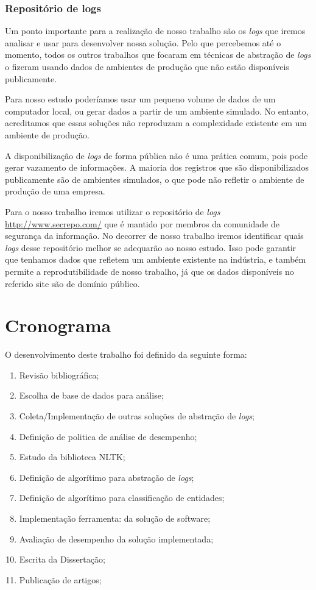 \documentclass[
	12pt,				%
	openright,			%
	twoside,			%
	a4paper,			%
	english,			%
	spanish,			%
	brazil,				%
	]{abntex2}
\begin{document}
\subsection{Repositório de logs}

Um ponto importante para a realização de nosso trabalho são os \emph{logs} que iremos analisar e usar para desenvolver nossa solução. Pelo que percebemos até o momento, todos os outros trabalhos que focaram em técnicas de abstração de \emph{logs} o fizeram usando dados de ambientes de produção que não estão disponíveis publicamente.

Para nosso estudo poderíamos usar um pequeno volume de dados de um computador local, ou gerar dados a partir de um ambiente simulado. No entanto, acreditamos que essas soluções não reproduzam a complexidade existente em um ambiente de produção.

A disponibilização de \emph{logs} de forma pública não é uma prática comum, pois pode gerar vazamento de informações. A maioria dos registros que são disponibilizados publicamente são de ambientes simulados, o que pode não refletir o ambiente de produção de uma empresa.

Para o nosso trabalho iremos utilizar o repositório de \emph{logs} \url{http://www.secrepo.com/} que é mantido por membros da comunidade de segurança da informação. No decorrer de nosso trabalho iremos identificar quais \emph{logs} desse repositório melhor se adequarão ao nosso estudo. Isso pode garantir que tenhamos dados que refletem um ambiente existente na indústria, e também permite a reprodutibilidade de nosso trabalho, já que os dados disponíveis no referido site são de domínio público.

\chapter{Cronograma}\label{chap:cronograma}
O desenvolvimento deste trabalho foi definido da seguinte forma:

\begin{enumerate}
	\item \label{rev-bibli} Revisão bibliográfica;
	\item \label{esc-base} Escolha de base de dados para análise;
	\item \label{imp-outras} Coleta/Implementação de outras soluções de abstração de \emph{logs};
	\item \label{def-pol} Definição de politica de análise de desempenho;
	\item \label{est-nltk} Estudo da biblioteca NLTK;
	\item \label{algo-abs} Definição de algorítimo para abstração de \emph{logs};
	\item \label{algo-clas} Definição de algorítimo para classificação de entidades;
	\item \label{imp-sol} Implementação ferramenta: da solução de software;
	\item \label{ava-des} Avaliação de desempenho da solução implementada;
	\item \label{esc-dis} Escrita da Dissertação;
	\item \label{pub-art} Publicação de artigos;
\end{enumerate}
\end{document}
